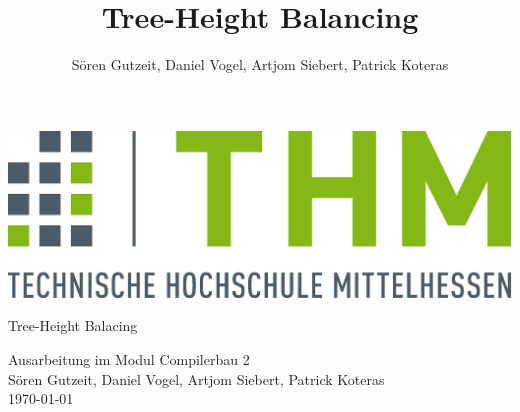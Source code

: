\documentclass[10pt,a4paper,titlepage,oneside]{report}
\author{Sören Gutzeit, Daniel Vogel, Artjom Siebert, Patrick Koteras}
\title{Tree-Height Balancing}
\begin{document}
\begin{titlepage}
	\begin{center}
		\includegraphics[width=1.0\textwidth]{images/logo}\\
		\vspace{3cm}
		\begin{Huge}
			 Tree-Height Balacing
		\end{Huge} \linebreak
		Ausarbeitung im Modul Compilerbau 2 \\
		\vspace{3cm}
		Sören Gutzeit, Daniel Vogel, Artjom Siebert, Patrick Koteras \\
		\today
	\end{center}
\end{titlepage}

\newpage 
\thispagestyle{empty}
\quad
\newpage

\setcounter{page}{1}
\tableofcontents

\setcounter{last_roman}{\value{page}}
\newpage



\newpage 
\thispagestyle{empty}
\quad
\newpage

\setcounter{page}{\value{last_roman}}

\newpage

\newpage

\newpage

\end{document}
